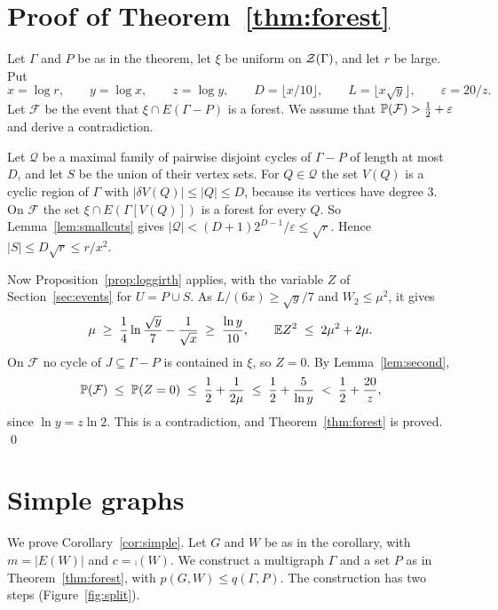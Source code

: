 \documentclass[11pt]{article}
\begin{document}
\section{Proof of Theorem~\ref{thm:forest}}\label{sec:proof}

Let $\Gamma$ and $P$ be as in the theorem, let $\xi$ be uniform on $\mathcal{Z}(\Gamma)$, and let $r$ be
large. Put
\[
  x=\log r,\qquad y=\log x,\qquad z=\log y,\qquad
  D=\lfloor x/10\rfloor,\qquad L=\lfloor x\sqrt y\rfloor,\qquad\varepsilon=20/z .
\]
Let $\mathcal{F}$ be the event that $\xi\cap E(\Gamma-P)$ is a forest. We assume that
$\mathbb{P}(\mathcal{F})>\frac12+\varepsilon$ and derive a contradiction.

 Let $\mathcal{Q}$ be a maximal family of pairwise disjoint cycles of
$\Gamma-P$ of length at most $D$, and let $S$ be the union of their vertex sets. For
$Q\in\mathcal{Q}$ the set $V(Q)$ is a cyclic region of $\Gamma$ with
$|\delta V(Q)|\le|Q|\le D$, because its vertices have degree $3$. On $\mathcal{F}$ the set
$\xi\cap E(\Gamma[V(Q)])$ is a forest for every $Q$. So Lemma~\ref{lem:smallcuts} gives
$|\mathcal{Q}|<(D+1)2^{D-1}/\varepsilon\le\sqrt r$. Hence $|S|\le D\sqrt r\le r/x^{2}$.

 Now Proposition~\ref{prop:loggirth} applies, with the
variable $Z$ of Section~\ref{sec:events} for $U=P\cup S$. As $L/(6x)\ge\sqrt y/7$ and
$W_2\le\mu^{2}$, it gives
\[
  \mu\;\ge\;\frac14\ln\frac{\sqrt y}{7}-\frac1{\sqrt x}\;\ge\;\frac{\ln y}{10},
  \qquad \mathbb{E} Z^{2}\;\le\;2\mu^{2}+2\mu .
\]
On $\mathcal{F}$ no cycle of $J\subseteq\Gamma-P$ is contained in $\xi$, so $Z=0$. By
Lemma~\ref{lem:second},
\[
  \mathbb{P}(\mathcal{F})\;\le\;\mathbb{P}(Z=0)\;\le\;\frac12+\frac1{2\mu}\;\le\;\frac12+\frac{5}{\ln y}
  \;<\;\frac12+\frac{20}{z},
\]
since $\ln y=z\ln2$. This is a contradiction, and Theorem~\ref{thm:forest} is proved. \qed

\section{Simple graphs}\label{sec:simple}

We prove Corollary~\ref{cor:simple}. Let $G$ and $W$ be as in the corollary, with $m=|E(W)|$
and $c=\comp(W)$. We construct a multigraph $\Gamma$ and a set $P$ as in
Theorem~\ref{thm:forest}, with $p(G,W)\le q(\Gamma,P)$. The construction has two steps
(Figure~\ref{fig:split}).
\end{document}
